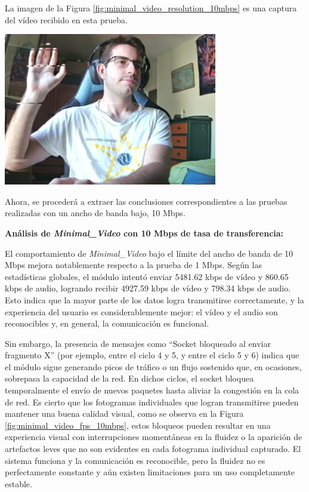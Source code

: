 La imagen de la Figura \ref{fig:minimal_video_resolution_10mbps} es una captura del vídeo recibido en esta prueba.
\begin{center}
  \includegraphics[width = 0.7\textwidth]{images/VideoRecibido2.3.png}
  \label{fig:minimal_video_resolution_10mbps}
\end{center}
\newpage

Ahora, se procederá a extraer las conclusiones correspondientes a las pruebas realizadas con un ancho de banda bajo, 10 Mbps.
\vspace{\baselineskip}

\textbf{Análisis de \textit{Minimal\_Video} con 10 Mbps de tasa de transferencia:}
\vspace{\baselineskip}

El comportamiento de \textit{Minimal\_Video} bajo el límite del ancho de banda de 10 Mbps mejora notablemente respecto a la prueba de 1 Mbps. Según las estadísticas globales, el módulo intentó enviar 5481.62 kbps de vídeo y 860.65 kbps de audio, logrando recibir 4927.59 kbps de vídeo y 798.34 kbps de audio. Esto indica que la mayor parte de los datos logra transmitirse correctamente, y la experiencia del usuario es considerablemente mejor: el vídeo y el audio son reconocibles y, en general, la comunicación es funcional.
\vspace{\baselineskip}

Sin embargo, la presencia de mensajes como ``Socket bloqueado al enviar fragmento X'' (por ejemplo, entre el ciclo 4 y 5, y entre el ciclo 5 y 6) indica que el módulo sigue generando picos de tráfico o un flujo sostenido que, en ocasiones, sobrepasa la capacidad de la red. En dichos ciclos, el socket bloquea temporalmente el envío de nuevos paquetes hasta aliviar la congestión en la cola de red. Es cierto que los fotogramas individuales que logran transmitirse pueden mantener una buena calidad visual, como se observa en la Figura \ref{fig:minimal_video_fps_10mbps}, estos bloqueos pueden resultar en una experiencia visual con interrupciones momentáneas en la fluidez o la aparición de artefactos leves que no son evidentes en cada fotograma individual capturado. El sistema funciona y la comunicación es reconocible, pero la fluidez no es perfectamente constante y aún existen limitaciones para un uso completamente estable.


